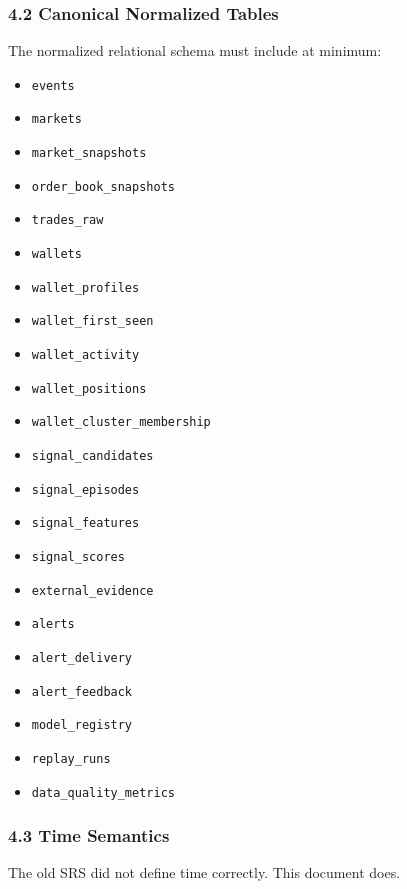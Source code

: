 \documentclass[
]{article}
\providecommand{\tightlist}{%
  \setlength{\itemsep}{0pt}\setlength{\parskip}{0pt}}
\begin{document}
\subsubsection{4.2 Canonical Normalized
Tables}\label{42-canonical-normalized-tables}

The normalized relational schema must include at minimum:

\begin{itemize}
\tightlist
\item
  \texttt{events}
\item
  \texttt{markets}
\item
  \texttt{market\_snapshots}
\item
  \texttt{order\_book\_snapshots}
\item
  \texttt{trades\_raw}
\item
  \texttt{wallets}
\item
  \texttt{wallet\_profiles}
\item
  \texttt{wallet\_first\_seen}
\item
  \texttt{wallet\_activity}
\item
  \texttt{wallet\_positions}
\item
  \texttt{wallet\_cluster\_membership}
\item
  \texttt{signal\_candidates}
\item
  \texttt{signal\_episodes}
\item
  \texttt{signal\_features}
\item
  \texttt{signal\_scores}
\item
  \texttt{external\_evidence}
\item
  \texttt{alerts}
\item
  \texttt{alert\_delivery}
\item
  \texttt{alert\_feedback}
\item
  \texttt{model\_registry}
\item
  \texttt{replay\_runs}
\item
  \texttt{data\_quality\_metrics}
\end{itemize}

\subsubsection{4.3 Time Semantics}\label{43-time-semantics}

The old SRS did not define time correctly. This document does.
\end{document}
